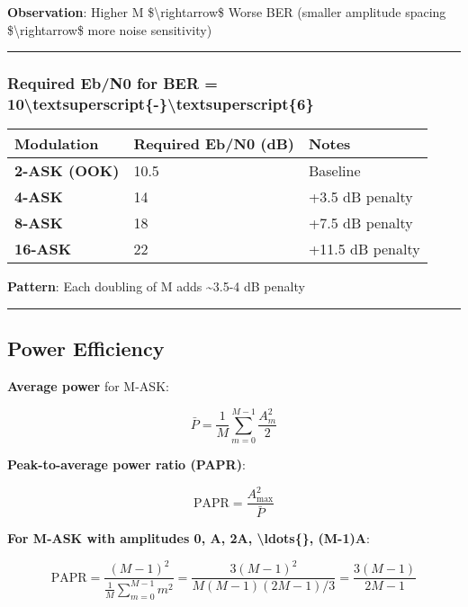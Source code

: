 \textbf{Observation}: Higher M \$\textbackslash rightarrow\$ Worse BER
(smaller amplitude spacing \$\textbackslash rightarrow\$ more noise
sensitivity)

\begin{center}\rule{0.5\linewidth}{0.5pt}\end{center}

\subsubsection{Required Eb/N0 for BER =
10\textbackslash textsuperscript\{-\}\textbackslash textsuperscript\{6\}}\label{required-ebn0-for-ber-10ux2076}

{\def\LTcaptype{} %
\begin{longtable}[]{@{}lll@{}}
\toprule\noalign{}
Modulation & Required Eb/N0 (dB) & Notes \\
\midrule\noalign{}
\endhead
\bottomrule\noalign{}
\endlastfoot
\textbf{2-ASK (OOK)} & 10.5 & Baseline \\
\textbf{4-ASK} & 14 & +3.5 dB penalty \\
\textbf{8-ASK} & 18 & +7.5 dB penalty \\
\textbf{16-ASK} & 22 & +11.5 dB penalty \\
\end{longtable}
}

\textbf{Pattern}: Each doubling of M adds \textasciitilde3.5-4 dB
penalty

\begin{center}\rule{0.5\linewidth}{0.5pt}\end{center}

\subsection{Power Efficiency}\label{power-efficiency}

\textbf{Average power} for M-ASK:

\[
\bar{P} = \frac{1}{M} \sum_{m=0}^{M-1} \frac{A_m^2}{2}
\]

\textbf{Peak-to-average power ratio (PAPR)}:

\[
\text{PAPR} = \frac{A_{\max}^2}{\bar{P}}
\]

\textbf{For M-ASK with amplitudes 0, A, 2A, \textbackslash ldots\{\},
(M-1)A}:

\[
\text{PAPR} = \frac{(M-1)^2}{\frac{1}{M}\sum_{m=0}^{M-1} m^2} = \frac{3(M-1)^2}{M(M-1)(2M-1)/3} = \frac{3(M-1)}{2M-1}
\]


